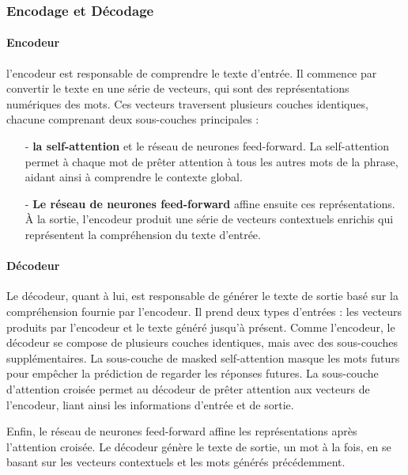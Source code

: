 \newpage
\subsubsection{Encodage et Décodage}

\paragraph{Encodeur} \hspace{0pt}

l'encodeur est responsable de comprendre le texte d'entrée. Il commence par convertir le texte en une série de vecteurs, qui sont des représentations numériques des mots. Ces vecteurs traversent plusieurs couches identiques, chacune comprenant deux sous-couches principales : 
\begin{itemize}
    \item[-] \textbf{la self-attention} et le réseau de neurones feed-forward. La self-attention permet à chaque mot de prêter attention à tous les autres mots de la phrase, aidant ainsi à comprendre le contexte global.

    \item[-] \textbf{Le réseau de neurones feed-forward} affine ensuite ces représentations. À la sortie, l'encodeur produit une série de vecteurs contextuels enrichis qui représentent la compréhension du texte d'entrée.
\end{itemize}

\paragraph{Décodeur} \hspace{0pt}

Le décodeur, quant à lui, est responsable de générer le texte de sortie basé sur la compréhension fournie par l'encodeur. Il prend deux types d'entrées : les vecteurs produits par l'encodeur et le texte généré jusqu'à présent. Comme l'encodeur, le décodeur se compose de plusieurs couches identiques, mais avec des sous-couches supplémentaires. La sous-couche de masked self-attention masque les mots futurs pour empêcher la prédiction de regarder les réponses futures. La sous-couche d'attention croisée permet au décodeur de prêter attention aux vecteurs de l'encodeur, liant ainsi les informations d'entrée et de sortie. 

Enfin, le réseau de neurones feed-forward affine les représentations après l'attention croisée. Le décodeur génère le texte de sortie, un mot à la fois, en se basant sur les vecteurs contextuels et les mots générés précédemment.

